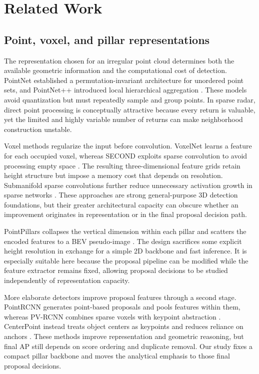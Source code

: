 \documentclass[preprint,12pt,times]{elsarticle}
\begin{document}
\section{Related Work}

\subsection{Point, voxel, and pillar representations}

The representation chosen for an irregular point cloud determines both the
available geometric information and the computational cost of detection.
PointNet established a permutation-invariant architecture for unordered point
sets, and PointNet++ introduced local hierarchical aggregation
\cite{qi2017pointnet,qi2017pointnetpp}. These models avoid quantization but
must repeatedly sample and group points. In sparse radar, direct point
processing is conceptually attractive because every return is valuable, yet
the limited and highly variable number of returns can make neighborhood
construction unstable.

Voxel methods regularize the input before convolution. VoxelNet learns a
feature for each occupied voxel, whereas SECOND exploits sparse convolution to
avoid processing empty space \cite{zhou2018voxelnet,yan2018second}. The
resulting three-dimensional feature grids retain height structure but impose a
memory cost that depends on resolution. Submanifold sparse convolutions further
reduce unnecessary activation growth in sparse networks
\cite{graham2018submanifold}. These approaches are strong general-purpose 3D
detection foundations, but their greater architectural capacity can obscure
whether an improvement originates in representation or in the final proposal
decision path.

PointPillars collapses the vertical dimension within each pillar and scatters
the encoded features to a BEV pseudo-image \cite{lang2019pointpillars}. The
design sacrifices some explicit height resolution in exchange for a simple 2D
backbone and fast inference. It is especially suitable here because the
proposal pipeline can be modified while the feature extractor remains fixed,
allowing proposal decisions to be studied independently of representation
capacity.

More elaborate detectors improve proposal features through a second stage.
PointRCNN generates point-based proposals and pools features within them,
whereas PV-RCNN combines sparse voxels with keypoint abstraction
\cite{shi2019pointrcnn,shi2020pvrcnn}. CenterPoint instead treats object
centers as keypoints and reduces reliance on anchors
\cite{yin2021centerpoint}. These methods improve representation and geometric
reasoning, but final AP still depends on score ordering and duplicate removal.
Our study fixes a compact pillar backbone and moves the analytical emphasis to
those final proposal decisions.
\end{document}

